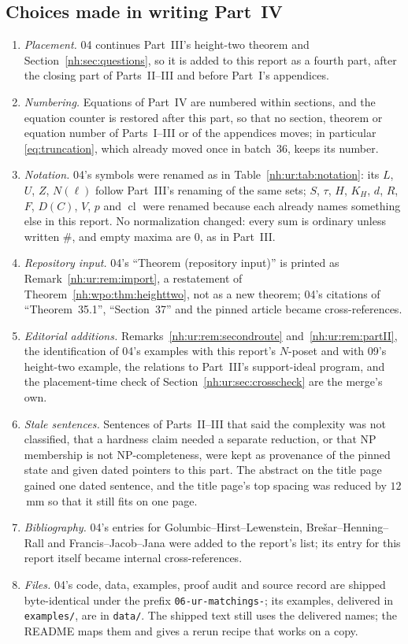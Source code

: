 \documentclass[11pt,a4paper]{article}
\theoremstyle{definition}
\theoremstyle{remark}
\newcommand{\ns}{\mathbin{\#}}
\begin{document}
\subsection{Choices made in writing Part~IV}
\begin{enumerate}
\item \emph{Placement.} 04 continues Part~III's height-two theorem and
Section~\ref{nh:sec:questions}, so it is added to this report as a fourth
part, after the closing part of Parts~II--III and before Part~I's appendices.
\item \emph{Numbering.} Equations of Part~IV are numbered within sections, and
the equation counter is restored after this part, so that no section,
theorem or equation number of Parts~I--III or of the appendices moves;
in particular \eqref{eq:truncation}, which already moved once in batch~36,
keeps its number.
\item \emph{Notation.} 04's symbols were renamed as in
Table~\ref{nh:ur:tab:notation}: its $L$, $U$, $Z$, $N(\ell)$ follow Part~III's
renaming of the same sets; $S$, $\tau$, $H$, $K_H$, $d$, $R$, $F$, $D(C)$, $V$,
$p$ and $\operatorname{cl}$ were renamed because each already names something
else in this report. No normalization changed: every sum is ordinary unless
written $\ns$, and empty maxima are $0$, as in Part~III.
\item \emph{Repository input.} 04's ``Theorem (repository input)'' is printed
as Remark~\ref{nh:ur:rem:import}, a restatement of
Theorem~\ref{nh:wpo:thm:heighttwo}, not as a new theorem; 04's citations of
``Theorem~35.1'', ``Section~37'' and the pinned article became
cross-references.
\item \emph{Editorial additions.} Remarks~\ref{nh:ur:rem:secondroute}
and~\ref{nh:ur:rem:partII}, the identification of 04's examples with this
report's $N$-poset and with 09's height-two example, the relations to
Part~III's support-ideal program, and the placement-time check of
Section~\ref{nh:ur:sec:crosscheck} are the merge's own.
\item \emph{Stale sentences.} Sentences of Parts~II--III that said the
complexity was not classified, that a hardness claim needed a separate
reduction, or that NP membership is not NP-completeness, were kept as
provenance of the pinned state and given dated pointers to this part. The
abstract on the title page gained one dated sentence, and the title page's
top spacing was reduced by $12$\,mm so that it still fits on one page.
\item \emph{Bibliography.} 04's entries for Golumbic--Hirst--Lewenstein,
Bre\v{s}ar--Henning--Rall and Francis--Jacob--Jana were added to the report's
list; its entry for this report itself became internal cross-references.
\item \emph{Files.} 04's code, data, examples, proof audit and source record
are shipped byte-identical under the prefix \texttt{06-ur-matchings-}; its
examples, delivered in \texttt{examples/}, are in \texttt{data/}. The shipped
text still uses the delivered names; the README maps them and gives a rerun
recipe that works on a copy.
\end{enumerate}
\end{document}
